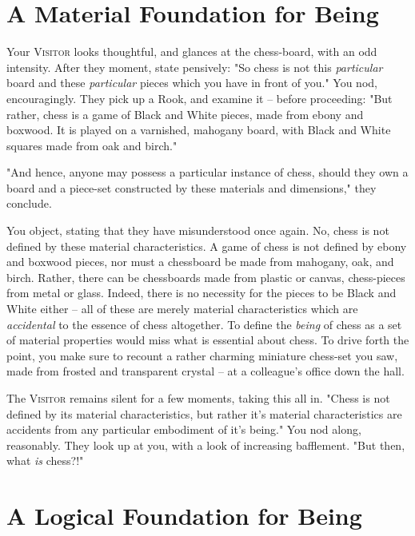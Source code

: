 \section{A Material Foundation for Being}


Your \textsc{Visitor} looks thoughtful, and glances at the chess-board, with an odd intensity. After they moment, state pensively: "So chess is not this \emph{particular} board and these \emph{particular} pieces which you have in front of you." You nod, encouragingly. They pick up a Rook, and examine it -- before proceeding: "But rather, chess is a game of Black and White pieces, made from ebony and boxwood. It is played on a varnished, mahogany board, with Black and White squares made from oak and birch."

"And hence, anyone may possess a particular instance of chess, should they own a board and a piece-set constructed by these materials and dimensions," they conclude.

You object, stating that they have misunderstood once again. No, chess is not defined by these material characteristics. A game of chess is not defined by ebony and boxwood pieces, nor must a chessboard be made from mahogany, oak, and birch. Rather, there can be chessboards made from plastic or canvas, chess-pieces from metal or glass. Indeed, there is no necessity for the pieces to be Black and White either -- all of these are merely material characteristics which are \emph{accidental} to the essence of chess altogether. To define the \emph{being} of chess as a set of material properties would miss what is essential about chess. To drive forth the point, you make sure to recount a rather charming miniature chess-set you saw, made from frosted and transparent crystal -- at a colleague's office down the hall.

The \textsc{Visitor} remains silent for a few moments, taking this all in. "Chess is not defined by its material characteristics, but rather it's material characteristics are accidents from any particular embodiment of it's being." You nod along, reasonably. They look up at you, with a look of increasing bafflement. "But then, what \emph{is} chess?!"

\section{A Logical Foundation for Being}

